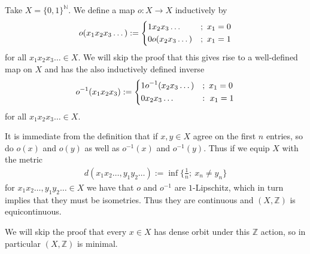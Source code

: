 \begin{example}
	Take $X = \{0, 1\}^\mathbb{N}$. We define a map $o: X \to X$ inductively by
	\begin{align*}
		o(x_1x_2x_3\dots) :=
		\begin{dcases}
			1x_2x_3\dots &;\ x_1 = 0\\
			0o(x_2x_3\dots) &;\ x_1 = 1
		\end{dcases}
	\end{align*}
	for all $x_1x_2x_3\dots \in X$. We will skip the proof that this gives rise to a well-defined map on $X$ and has the also inductively defined inverse
	\begin{align*}
		o^{-1}(x_1x_2x_3) :=
		\begin{dcases}
			1o^{-1}(x_2x_3\dots) &;\ x_1=0\\
			0x_2x_3\dots &:\ x_1=1
		\end{dcases}
	\end{align*}
	for all $x_1x_2x_3\dots \in X$.
	
	It is immediate from the definition that if $x, y \in X$ agree on the first $n$ entries, so do $o(x)$ and $o(y)$ as well as $o^{-1}(x)$ and $o^{-1}(y)$. Thus if we equip $X$ with the metric
	\begin{align*}
		d(x_1x_2\dots, y_1y_2\dots) := \inf\{\frac{1}{n};\ x_n \neq y_n\}
	\end{align*}
	for $x_1x_2\dots, y_1y_2\dots \in X$ we have that $o$ and $o^{-1}$ are $1$-Lipschitz, which in turn implies that they must be isometries. Thus they are continuous and $(X, \mathbb{Z})$ is equicontinuous.
	
	We will skip the proof that every $x \in X$ has dense orbit under this $\mathbb{Z}$ action, so in particular $(X, \mathbb{Z})$ is minimal.
\end{example}

